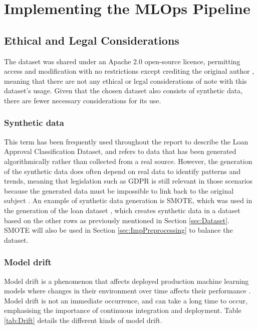 \documentclass[12pt]{report}
\begin{document}
\chapter{Implementing the MLOps Pipeline}
\section{Ethical and Legal Considerations}
The dataset was shared under an Apache 2.0 open-source licence, permitting access and modification with no restrictions
except crediting the original author \autocite{apache_apache_nodate}, meaning that there are not any ethical or legal 
considerations of note with this dataset's usage. Given that the chosen dataset also consists of synthetic data,
there are fewer necessary considerations for its use.

\subsection{Synthetic data}
This term has been frequently used throughout the report to describe the Loan Approval Classification Dataset, and refers to 
data that has been generated algorithmically rather than collected from a real source. However, the generation of the 
synthetic data does often depend on real data to identify patterns and trends, meaning that legislation such as GDPR is still relevant
in those scenarios because the generated data must be impossible to link back to the original subject \autocite{Lopez2022OnTL}.
An example of synthetic data generation is SMOTE, which was used in the generation of the loan dataset \autocite{zoppelleto_financial_nodate}, 
which creates synthetic data in a dataset based on the other rows as previously mentioned in Section \ref{sec:Dataset}. SMOTE will also be used in Section 
\ref{sec:ImpPreprocessing} to balance the dataset.

\subsection{Model drift}
Model drift is a phenomenon that affects deployed production machine learning models where changes in 
their environment over time affects their performance \autocite{nigenda_amazon_2022}. Model drift is not an 
immediate occurrence, and can take a long time to occur, emphasising the importance of continuous integration and deployment. 
Table \ref{tab:Drift} details the different kinds of model drift.
\end{document}
